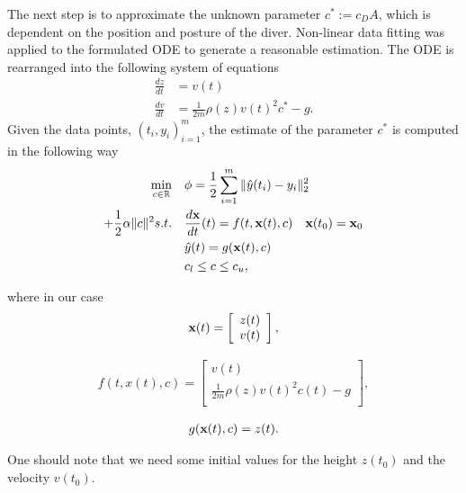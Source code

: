 The next step is to approximate the unknown parameter $c^*:=c_{D}A$, which is dependent on the position and posture of the diver. Non-linear data fitting was applied to the formulated ODE to generate a reasonable estimation. The ODE is rearranged into the following system of equations
\begin{align*}
\frac{dz}{dt}&=v(t)\\
\frac{dv}{dt}&=\frac{1}{2m}\rho(z)v(t)^2c^*-g.
\end{align*}
Given the data points, ${(t_i,y_i)}_{i=1}^m$, the estimate of the parameter $c^*$ is computed in the following way
\begin{align}
\underset{c\in\mathbb{R}}{\min}\quad &\phi=\frac{1}{2}\sum_{i=1}^m\Vert\hat{y}(t_i)-y_i\Vert_2^2\\+\frac{1}{2}\alpha\Vert c\Vert^2
s.t.\quad &\frac{d\textbf{x}}{dt}(t)=f(t,\textbf{x}(t),c)\quad \textbf{x}(t_0)=\textbf{x}_0\\
	&\hat{y}(t)=g(\textbf{x}(t),c)\\
	&c_l\leq c\leq c_u,
\end{align}


where in our case
\begin{align*}
\textbf{x}(t)=\left[
\begin{array}{c}
z(t)\\
v(t)\\
\end{array}
\right],
\end{align*}

\begin{align*}
f(t,x(t),c)=\left[
\begin{array}{c}
v(t)\\
\frac{1}{2m}\rho(z)v(t)^2c(t)-g\\
\end{array}
\right],
\end{align*}

\begin{align*}
g(\textbf{x}(t),c)=z(t).
\end{align*}

One should note that we need some initial values for the height $z(t_0)$ and the velocity $v(t_0)$.
